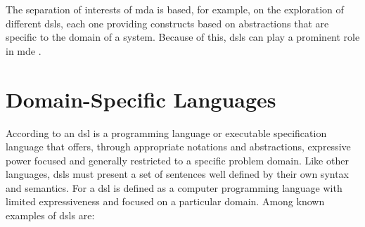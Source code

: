 The separation of interests of \ac{mda} is based, for example, on the exploration of different \acp{dsl}, each one providing constructs based on abstractions that are specific to the domain of a system.
Because of this, \acp{dsl} can play a prominent role in \ac{mde} \cite{Schmidt:2006, Fowler:2010}.



\section{Domain-Specific Languages}
\label{sec_back:dsl}

According to \cite{vanDeursen:2000} an \ac{dsl} is a programming language or executable specification language that offers, through appropriate notations and abstractions, expressive power focused and generally restricted to a specific problem domain.
Like other languages, \acp{dsl} must present a set of sentences well defined by their own syntax and semantics.
For \cite{Fowler:2010} a \ac{dsl} is defined as a computer programming language with limited expressiveness and focused on a particular domain.
Among known examples of \acp{dsl} are:

